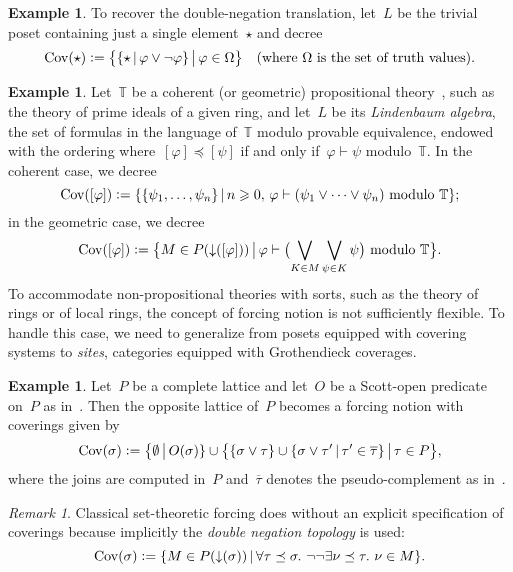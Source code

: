 \documentclass[com,11pt,crcready]{iosart2x}
\theoremstyle{definition}
\newtheorem{example}[definition]{Example}
\theoremstyle{plain}
\theoremstyle{remark}
\newtheorem{remark}[definition]{Remark}
\newcommand{\TT}{\mathbb{T}}
\newcommand{\defeq}{\vcentcolon=}
\newcommand{\Cov}{\mathrm{Cov}}
\renewcommand{\_}{\mathpunct{.}\,}
\begin{document}
\begin{example}\label{ex:notion-negneg}To recover the double-negation translation, let~$L$ be the
trivial poset containing just a single element~$\star$ and decree
\[ \Cov(\star) \defeq \bigl\{ \{ \star \,|\, \varphi \vee \neg\varphi \} \,\big|\, \varphi \in \Omega \bigr\}
\quad\text{(where~$\Omega$ is the set of truth values).} \]
\end{example}

\begin{example}\label{ex:notion-lindenbaum}Let~$\TT$ be a coherent (or
geometric) propositional theory~\cite[Definition~D1.1.3]{johnstone:elephant},
such as the theory of prime ideals of a given ring, and let~$L$ be its
\emph{Lindenbaum algebra}, the set of formulas in the language of~$\TT$ modulo
provable equivalence, endowed with the ordering where~$[\varphi] \preceq
[\psi]$ if and only if~$\varphi \vdash \psi$ modulo~$\TT$. In the coherent
case, we decree
\[ \Cov([\varphi]) \defeq \{ \{ \psi_1,\ldots,\psi_n \} \,|\,
  n \geq 0,\,\text{$\varphi \vdash (\psi_1 \vee \cdots \vee \psi_n)$ modulo~$\TT$}
  \}; \]
in the geometric case, we decree
\[ \Cov([\varphi]) \defeq \bigl\{ M \in P({\downarrow}([\varphi])) \,\big|\,
  \text{$\varphi \vdash \bigl(\bigvee_{K \in M} \bigvee_{\psi \in K} \psi\bigr)$ modulo~$\TT$}
  \bigr\}. \]
To accommodate non-propositional theories with sorts, such as the theory of
rings or of local rings, the concept of forcing notion is not
sufficiently flexible. To handle this case, we need to generalize from posets
equipped with covering systems to \emph{sites}, categories equipped with
Grothendieck coverages.
\end{example}

\begin{example}\label{ex:notion-scott}Let~$P$ be a complete lattice and let~$O$
be a Scott-open predicate on~$P$ as in~\cite{wessel-schuster:radical}. Then the
opposite lattice of~$P$ becomes a forcing notion with coverings given by
\[
  \Cov(\sigma) \defeq \bigl\{ \emptyset \,\big|\, O(\sigma) \} \cup
    \bigl\{ \{ \sigma \vee \tau \} \cup \{ \sigma \vee \tau' \,|\, \tau' \in
    \overline{\tau} \} \,\big|\, \tau \in P \bigr\},
\]
where the joins are computed in~$P$ and~$\overline{\tau}$ denotes the pseudo-complement as
in~\cite[Equation~(6)]{wessel-schuster:radical}.
\end{example}

\begin{remark}Classical set-theoretic forcing
does without an explicit specification of coverings because implicitly the
\emph{double negation topology} is used:
\[ \Cov(\sigma) \defeq \{ M \in P({\downarrow}(\sigma)) \,|\,
  \forall \tau \preceq \sigma\_ \neg\neg \exists \nu \preceq \tau\_ \nu \in M
  \}. \]
\end{remark}
\end{document}
